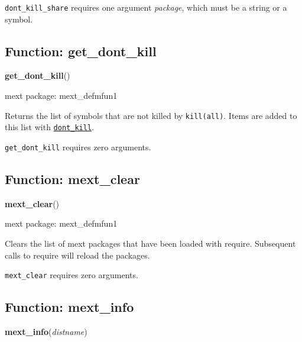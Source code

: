\documentclass[]{article}
\begin{document}
\vspace{5 pt}

   {\tt dont\_kill\_share} requires one argument {\it package}, which must be a string or a symbol.


\vspace{5 pt}


\subsection{Function: get\_dont\_kill\label{sec:get_dont_kill}}
\hypertarget{get_dont_kill}{}
{\bf get\_dont\_kill}()


\noindent mext package: mext\_defmfun1



\vspace{5 pt}
Returns the list of symbols that are not killed by \verb#kill(all)#. Items are added to this list with \hyperlink{dont_kill}{{\tt dont\_kill}}. 

\vspace{5 pt}

   {\tt get\_dont\_kill} requires zero arguments.


\vspace{5 pt}


\subsection{Function: mext\_clear\label{sec:mext_clear}}
\hypertarget{mext_clear}{}
{\bf mext\_clear}()


\noindent mext package: mext\_defmfun1



\vspace{5 pt}
Clears the list of mext packages that have been loaded with require. Subsequent calls to require will reload the packages. 

\vspace{5 pt}

   {\tt mext\_clear} requires zero arguments.


\vspace{5 pt}


\subsection{Function: mext\_info\label{sec:mext_info}}
\hypertarget{mext_info}{}
{\bf mext\_info}({\it distname})
\end{document}
